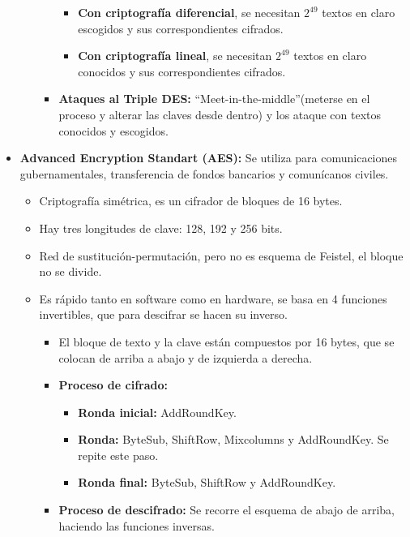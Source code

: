 \documentclass[12pt, twoside, openright]{report} %
\begin{document}
\begin{itemize}
\begin{itemize}
\begin{itemize}
\begin{itemize}
				                  \item \textbf{Con criptografía diferencial}, se necesitan $2^{49}$ textos en claro escogidos y sus correspondientes cifrados.
				                  \item \textbf{Con criptografía lineal}, se necesitan $2^{49}$ textos en claro conocidos y sus correspondientes cifrados.
			                  \end{itemize}
			            \item \textbf{Ataques al Triple DES:} \enquote{Meet-in-the-middle}(meterse en el proceso y alterar las claves desde dentro) y los ataque con textos conocidos y escogidos.
		            \end{itemize}
	      \end{itemize}
	\item \textbf{Advanced Encryption Standart (AES):} Se utiliza para comunicaciones gubernamentales, transferencia de fondos bancarios y comunícanos civiles.
	      \begin{itemize}
		      \item Criptografía simétrica, es un cifrador de bloques de 16 bytes.
		      \item Hay tres longitudes de clave: 128, 192 y 256 bits.
		      \item Red de sustitución-permutación, pero no es esquema de Feistel, el bloque no se divide.
		      \item Es rápido tanto en software como en hardware, se basa en 4 funciones invertibles, que para descifrar se hacen su inverso.
		            \begin{itemize}
			            \item El bloque de texto y la clave están compuestos por 16 bytes, que se colocan de arriba a abajo y de izquierda a derecha.
			            \item \textbf{Proceso de cifrado:}
			                  \begin{itemize}
				                  \item \textbf{Ronda inicial:} AddRoundKey.
				                  \item \textbf{Ronda:} ByteSub, ShiftRow, Mixcolumns y AddRoundKey. Se repite este paso.
				                  \item \textbf{Ronda final:} ByteSub, ShiftRow y AddRoundKey.
			                  \end{itemize}
			            \item \textbf{Proceso de descifrado:} Se recorre el esquema de abajo de arriba, haciendo las funciones inversas.

\end{itemize}
\end{itemize}
\end{itemize}
\end{document}
